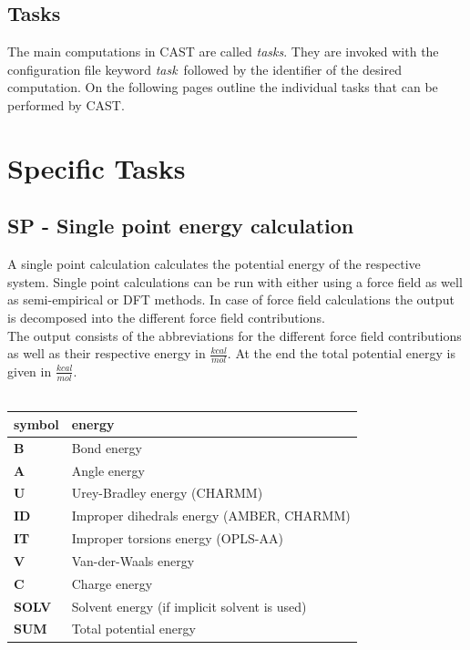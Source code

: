 \documentclass[10pt,a4paper]{article} %
\begin{document}
	\subsection{Tasks}
	The main computations in \ac{CAST} are called \textit{tasks}. They are invoked with the configuration file keyword \glqq\textit{task}\grqq~followed by the identifier of the desired computation. On the following pages outline the individual tasks that can be performed by \ac{CAST}.

	\newpage

	\section{Specific Tasks}

	\subsection{SP - Single point energy calculation}
	A single point calculation calculates the potential energy of the respective system. Single point calculations can be run with either using a force field as well as semi-empirical or \ac{DFT} methods. In case of force field calculations the output is decomposed into the different force field contributions.\\

	The output consists of the abbreviations for the different force field contributions as well as their respective energy in $\frac{kcal}{mol}$. At the end the total potential energy is given in $\frac{kcal}{mol}$.\\~\\

	\begin{tabularx}{\textwidth}{l|l}
		symbol & energy\\
		\hline
		\textbf{B} & Bond energy\\
		\textbf{A} & Angle energy\\
		\textbf{U} & Urey-Bradley energy (\ac{CHARMM})\\
		\textbf{ID} & Improper dihedrals energy (\ac{AMBER}, \ac{CHARMM})\\
		\textbf{IT} & Improper torsions energy (\ac{OPLS-AA})\\
		\textbf{V} & Van-der-Waals energy\\
		\textbf{C} & Charge energy\\
		\textbf{SOLV} & Solvent energy (if implicit solvent is used)\\
		\textbf{SUM} & Total potential energy\\

	\end{tabularx}\\~\\
\end{document}
